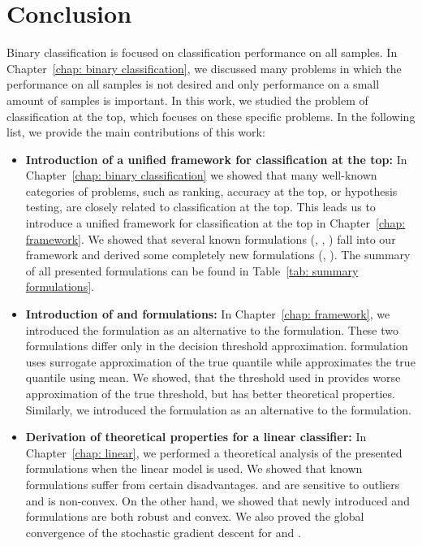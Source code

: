 \chapter*{Conclusion}

Binary classification is focused on classification performance on all samples. In Chapter~\ref{chap: binary classification}, we discussed many problems in which the performance on all samples is not desired and only performance on a small amount of samples is important. In this work, we studied the problem of classification at the top, which focuses on these specific problems. In the following list, we provide the main contributions of this work:
\begin{itemize}
  \item \textbf{Introduction of a unified framework for classification at the top:} In Chapter~\ref{chap: binary classification} we showed that many well-known categories of problems, such as ranking, accuracy at the top, or hypothesis testing, are closely related to classification at the top. This leads us to introduce a unified framework for classification at the top in Chapter~\ref{chap: framework}. We showed that several known formulations (\TopPush, \Grill, \tauFPL) fall into our framework and derived some completely new formulations (\PatMat, \PatMatNP). The summary of all presented formulations can be found in Table~\ref{tab: summary formulations}.
  \item \textbf{Introduction of \PatMat and \PatMatNP formulations:} In Chapter~\ref{chap: framework}, we introduced the \PatMat formulation as an alternative to the \TopMeanK formulation. These two formulations differ only in the decision threshold approximation. \PatMat formulation uses surrogate approximation of the true quantile while \TopMeanK approximates the true quantile using mean. We showed, that the threshold used in \PatMat  provides worse approximation of the true threshold, but has better theoretical properties. Similarly, we introduced the \PatMatNP formulation as an alternative to the \tauFPL formulation.
  \item \textbf{Derivation of theoretical properties for a linear classifier:} In Chapter~\ref{chap: linear}, we performed a theoretical analysis of the presented formulations when the linear model is used. We showed that known formulations suffer from certain disadvantages. \TopPush and \tauFPL are sensitive to outliers and \Grill is non-convex. On the other hand, we showed that newly introduced \PatMat and \PatMatNP formulations are both robust and convex. We also proved the global convergence of the stochastic gradient descent for \PatMat and \PatMatNP.

\end{itemize}
